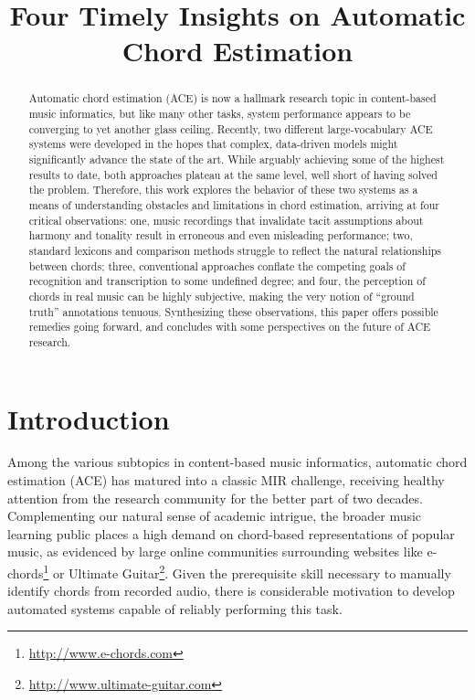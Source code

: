 \documentclass{article}
\title{Four Timely Insights on Automatic Chord Estimation}
\begin{document}
%
\maketitle
\sloppy
%
\begin{abstract}

Automatic chord estimation (ACE) is now a hallmark research topic in content-based music informatics, but like many other tasks, system performance appears to be converging to yet another glass ceiling.
Recently, two different large-vocabulary ACE systems were developed in the hopes that complex, data-driven models might significantly advance the state of the art.
While arguably achieving some of the highest results to date, both approaches plateau at the same level, well short of having solved the problem.
Therefore, this work explores the behavior of these two systems as a means of understanding obstacles and limitations in chord estimation, arriving at four critical observations:
one, music recordings that invalidate tacit assumptions about harmony and tonality result in erroneous and even misleading performance;
two, standard lexicons and comparison methods struggle to reflect the natural relationships between chords;
three, conventional approaches conflate the competing goals of recognition and transcription to some undefined degree;
and four, the perception of chords in real music can be highly subjective, making the very notion of ``ground truth'' annotations tenuous.
Synthesizing these observations, this paper offers possible remedies going forward, and concludes with some perspectives on the future of ACE research.

\end{abstract}


\section{Introduction}
\label{sec:introduction}

Among the various subtopics in content-based music informatics, automatic chord estimation (ACE) has matured into a classic MIR challenge, receiving healthy attention from the research community for the better part of two decades.
Complementing our natural sense of academic intrigue, the broader music learning public places a high demand on chord-based representations of popular music, as evidenced by large online communities surrounding websites like e-chords\footnote{\url{http://www.e-chords.com}} or Ultimate Guitar\footnote{\url{http://www.ultimate-guitar.com}}.
Given the prerequisite skill necessary to manually identify chords from recorded audio, there is considerable motivation to develop automated systems capable of reliably performing this task.
\end{document}
